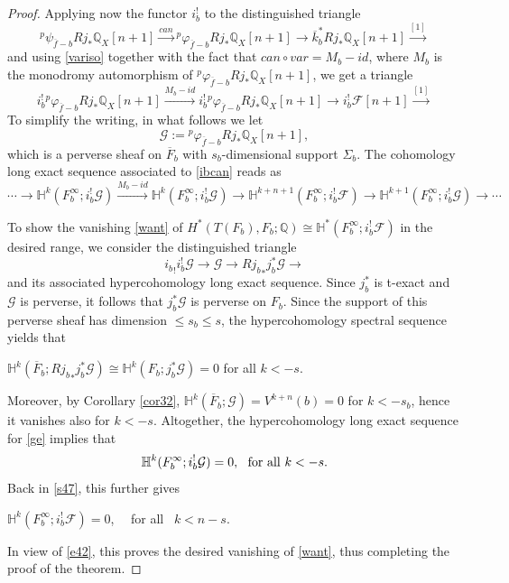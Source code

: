 \documentclass[12pt,leqno,twoside]{amsart}
\theoremstyle{remark}
\theoremstyle{remark}
\theoremstyle{definition}
\theoremstyle{remark}
\theoremstyle{remark}
\theoremstyle{remark}
\numberwithin{equation}{section}  %
\def\be{\begin{equation}}
\def\ee{\end{equation}}
\newcommand{\lra}{\longrightarrow}
\newcommand{\cF}{\mathcal{F}}
\newcommand{\cG}{\mathcal{G}}
\newcommand{\bH}{\mathbb{H}}
\newcommand{\bQ}{\mathbb{Q}}
\newcommand{\of}{\overline{f}}
\newcommand{\oF}{\overline{F}}
\newcommand{\ok}{\overline{k}}
\begin{document}
\begin{proof}
Applying now the functor $i_b^!$ to the distinguished triangle
\be\label{can}
{^p\psi}_{\of-b}Rj_*\bQ_X[n+1]  \overset{can }{\lra} {^p\varphi}_{\of-b}Rj_*\bQ_X[n+1]
 \lra \ok_b^*Rj_*\bQ_X[n+1] \overset{[1]}{\lra}
\ee
and using \eqref{variso} together with the fact that $can \circ var=M_b -id$, where $M_b$ is the monodromy automorphism of ${^p\varphi}_{\of-b}Rj_*\bQ_X[n+1]$, we get a triangle
\be\label{ibcan}
i_b^!{^p\varphi}_{\of-b}Rj_*\bQ_X[n+1]  \overset{M_b-id}{\lra} i_b^!{^p\varphi}_{\of-b}Rj_*\bQ_X[n+1]
 \lra i_b^!\cF[n+1] \overset{[1]}{\lra}
\ee
To simplify the writing, in what follows we let
\[ \cG:={^p\varphi}_{\of-b}Rj_*\bQ_X[n+1] ,\]
which is a perverse sheaf on $\oF_b$ with $s_b$-dimensional support $\Sigma_b$.
The cohomology long exact sequence associated to \eqref{ibcan} reads as
\be\label{s47}
\cdots \to \bH^k(F_b^\infty; i_b^! \cG) \overset{M_b-id}{\to} \bH^k(F_b^\infty; i_b^! \cG) \to \bH^{k+n+1}(F_b^\infty; i_b^! \cF) \to \bH^{k+1}(F_b^\infty; i_b^! \cG) \to \cdots
\ee

To show the vanishing \eqref{want} of $H^*(T(F_b),F_b;\bQ)\cong \bH^{*}(F_b^\infty; i_b^! \cF)$ in the desired range, we consider the distinguished triangle
\be\label{ge}
{i_b}_!i_b^! \cG \lra \cG \lra R{j_b}_* j_b^* \cG \lra
\ee
and its associated hypercohomology long exact sequence. 
Since $j_b^*$ is t-exact and $\cG$ is perverse, it follows that $j_b^* \cG$ is perverse on $F_b$. Since the support of this perverse sheaf has dimension $\leq s_b\leq s$, the hypercohomology spectral sequence yields that 
\begin{center} $\bH^k(\oF_b; R{j_b}_* j_b^* \cG)\cong \bH^k(F_b;  j_b^* \cG)=0$ for all $k<-s$.\end{center} 
Moreover, by Corollary \ref{cor32}, $\bH^k(\oF_b; \cG)=V^{k+n}(b)=0$  for $k<-s_b$, hence it vanishes also for $k<-s$. Altogether, the hypercohomology long exact sequence for \eqref{ge} implies that 
\be\label{e44} \bH^k(F_b^\infty; i_b^! \cG)=0, \ \  {\rm for \ all} \ k<-s.\ee
Back in \eqref{s47}, this further gives
\begin{center} $\bH^k(F_b^\infty; i_b^! \cF)=0$, \ \  for all \ $k<n-s$.\end{center}
In view of \eqref{e42}, this proves the desired vanishing of \eqref{want}, thus completing the proof of the theorem.
\end{proof}
\end{document}
